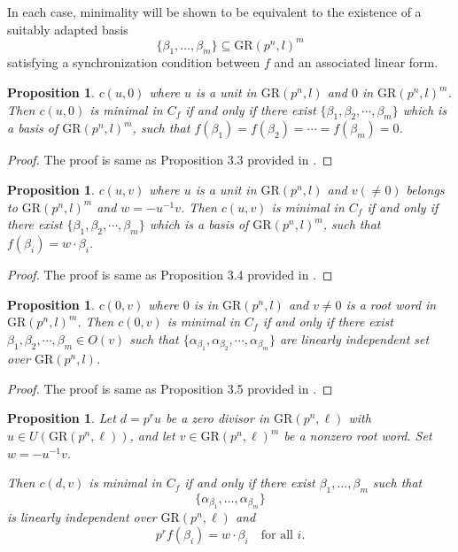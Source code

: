 \documentclass[10pt]{article}
\newtheorem{prop}[lem]{Proposition}
\theoremstyle{definition}
\begin{document}
In each case, minimality will be shown to be equivalent to the existence
of a suitably adapted basis
\[
\{\beta_1,\dots,\beta_m\}
\subseteq \mathrm{GR}(p^n,l)^m
\]
satisfying a synchronization condition between $f$ and an associated linear form.

\begin{prop}\label{Proposition 15}
$c(u,0)$ where $u$ is a unit in $\mathrm{GR}(p^n,l)$ and $0$ in $\mathrm{GR}(p^n,l)^m$. Then $c(u,0)$ is minimal in $C_f$ if and only if there exist  $\{\beta_1,\beta_2,\cdots,\beta_m\}$ which is a basis of $\mathrm{GR}(p^n,l)^m$, such that $f(\beta_1)=f(\beta_2)=\cdots=f(\beta_m)=0$. \end{prop}
\begin{proof}
The proof is same as Proposition 3.3 provided in \cite{WuLuCao}.
\end{proof}
\begin{prop}\label{Proposition 16}
$c(u,v)$ where $u$ is a unit in $\mathrm{GR}(p^n,l)$ and $v(\neq 0)$ belongs to $\mathrm{GR}(p^n,l)^m$ and $w=-u^{-1}v$. Then $c(u,v)$ is minimal in $C_f$ if and only if there exist  $\{\beta_1,\beta_2,\cdots,\beta_m\}$ which is a basis of $\mathrm{GR}(p^n,l)^m$, such that $f(\beta_i)=w\cdot \beta_i$.
\end{prop}
\begin{proof}
The proof is same as Proposition 3.4 provided in \cite{WuLuCao}.
\end{proof}
\begin{prop}\label{Proposition 17}
$c(0,v)$ where $0$ is in $\mathrm{GR}(p^n,l)$ and $v\neq 0$ is a root word in $\mathrm{GR}(p^n,l)^m$. Then $c(0,v)$ is minimal in $C_f$ if and only if there exist $\beta_1,\beta_2,\cdots,\beta_m \in O(v)$ such that $\{\alpha_{\beta_1},\alpha_{\beta_2},\cdots,\alpha_{\beta_m}\}$ are linearly independent set over $\mathrm{GR}(p^n,l)$.
\end{prop}
\begin{proof}
The proof is same as Proposition 3.5 provided in \cite{WuLuCao}.
\end{proof}

\begin{prop}\label{Proposition 18}
Let $d = p^{r}u$ be a zero divisor in $\mathrm{GR}(p^{n},\ell)$ with
$u \in U(\mathrm{GR}(p^{n},\ell))$, and let
$v \in \mathrm{GR}(p^{n},\ell)^m$ be a nonzero root word.
Set $w = -u^{-1}v$.

Then $c(d,v)$ is minimal in $C_f$ if and only if there exist
$\beta_1,\dots,\beta_m$ such that
\[
\{\alpha_{\beta_1},\dots,\alpha_{\beta_m}\}
\]
is linearly independent over $\mathrm{GR}(p^{n},\ell)$ and
\[
p^{r} f(\beta_i)= w \cdot \beta_i
\quad \text{for all } i.
\]
\end{prop}
\end{document}
